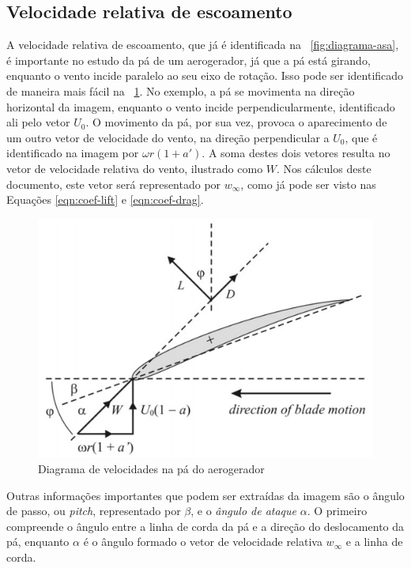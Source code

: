 \documentclass{article}
\let\oldforeignlanguage\foreignlanguage
\renewcommand\foreignlanguage[2]{\oldforeignlanguage{#1}{\emph{#2}}}
\begin{document}
	\subsection{Velocidade relativa de escoamento}
	A velocidade relativa de escoamento, que já é identificada na \figurename\ \ref{fig:diagrama-asa}, é importante no estudo da pá de um aerogerador,
	já que a pá está girando, enquanto o vento incide paralelo ao seu eixo de rotação.
	Isso pode ser identificado de maneira mais fácil na \figurename\ \ref{fig:velocidades-asa}.
	No exemplo, a pá se movimenta na direção horizontal da imagem, enquanto o vento incide perpendicularmente, identificado ali pelo vetor $U_0$.
	O movimento da pá, por sua vez, provoca o aparecimento de um outro vetor de velocidade do vento, na direção perpendicular a $U_0$,
	que é identificado na imagem por $\omega r(1+a')$.
	A soma destes dois vetores resulta no vetor de velocidade relativa do vento, ilustrado como $W$.
	Nos cálculos deste documento, este vetor será representado por $w_\infty$, 
	como já pode ser visto nas Equações \ref{eqn:coef-lift} e \ref{eqn:coef-drag}.

	\begin{figure}[ht]
		\centering
		\includegraphics[scale=0.5]{diagrama-velocidades-asa.png}
		\caption{Diagrama de velocidades na pá do aerogerador}
		\label{fig:velocidades-asa}
	\end{figure}

	Outras informações importantes que podem ser extraídas da imagem são o ângulo de passo, ou \foreignlanguage{english}{pitch},
	representado por $\beta$, e o \emph{ângulo de ataque} $\alpha$.
	O primeiro compreende o ângulo entre a linha de corda da pá e a direção do deslocamento da pá, 
	enquanto $\alpha$ é o ângulo formado o vetor de velocidade relativa $w_\infty$ e a linha de corda.
	
\end{document}
